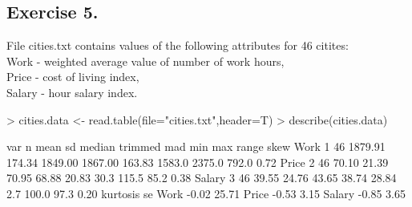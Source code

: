 \documentclass[a4paper]{article}
\begin{document}
\subsection{Exercise 5.} File cities.txt contains values of the following
attributes for 46 citites:\\
Work - weighted average value of number of work hours,\\
Price - cost of living index,\\
Salary - hour salary index.\\
\begin{Schunk}
\begin{Sinput}
> cities.data <- read.table(file="cities.txt",header=T)
> describe(cities.data)
\end{Sinput}
\begin{Soutput}
       var  n    mean     sd  median trimmed    mad    min    max range skew
Work     1 46 1879.91 174.34 1849.00 1867.00 163.83 1583.0 2375.0 792.0 0.72
Price    2 46   70.10  21.39   70.95   68.88  20.83   30.3  115.5  85.2 0.38
Salary   3 46   39.55  24.76   43.65   38.74  28.84    2.7  100.0  97.3 0.20
       kurtosis    se
Work      -0.02 25.71
Price     -0.53  3.15
Salary    -0.85  3.65
\end{Soutput}
\end{Schunk}
\end{document}
